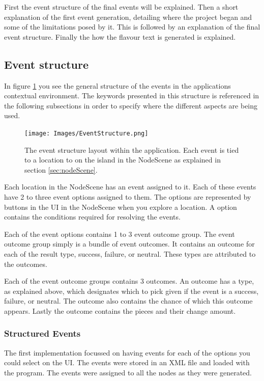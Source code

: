 First the event structure of the final events will be explained. Then a short explanation of the first event generation, detailing where the project began and some of the limitations posed by it. This is followed by an explanation of the final event structure. Finally the how the flavour text is generated is explained.

\subsection{Event structure}
In figure \ref{fig:eStruc} you see the general structure of the events in the applications contextual environment. The keywords presented in this structure is referenced in the following subsections in order to specify where the different aspects are being used.

\begin{figure}[h]
    \centering
    \texttt{[image: Images/EventStructure.png]}
    \caption{The event structure layout within the application. Each event is tied to a location to on the island in the NodeScene as explained in section \ref{sec:nodeScene}.}
    \label{fig:eStruc}
\end{figure}

Each location in the NodeScene has an event assigned to it. 
Each of these events have 2 to three event options assigned to them. The options are represented by buttons in the UI in the NodeScene when you explore a location. A option contains the conditions required for resolving the events. 

Each of the event options contains 1 to 3 event outcome group. The event outcome group simply is a bundle of event outcomes. It contains an outcome for each of the result type, success, failure, or neutral. These types are attributed to the outcomes.

Each of the event outcome groups contains 3 outcomes. An outcome has a type, as explained above, which designates which to pick given if the event is a success, failure, or neutral. The outcome also contains the chance of which this outcome appears. Lastly the outcome contains the pieces and their change amount. 

\subsubsection{Structured Events}
The first implementation focussed on having events for each of the options you could select on the UI. The events were stored in an XML file and loaded with the program. The events were assigned to all the nodes as they were generated.

